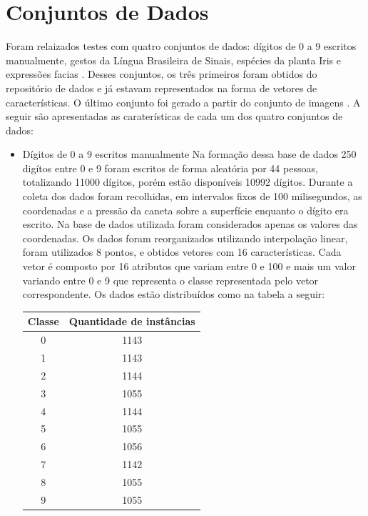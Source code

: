 \section{Conjuntos de Dados}
Foram relaizados testes com quatro conjuntos de dados: dígitos de 0 a 9 escritos manualmente, gestos da Língua Brasileira de Sinais, espécies da planta Iris e expressões facias . Desses conjuntos, os três primeiros foram obtidos do repositório de dados  e já estavam representados na forma de vetores de características. O último conjunto foi gerado a partir do conjunto de imagens . A seguir são apresentadas as caraterísticas de cada um dos quatro conjuntos de dados:

\begin{itemize}
\item{Dígitos de 0 a 9 escritos manualmente \cite{Digitos}}
Na formação dessa base de dados 250 digítos entre 0 e 9 foram escritos de forma aleatória por 44 pessoas, totalizando 11000 dígitos, porém estão disponíveis 10992 dígitos. Durante a coleta dos dados foram recolhidas, em intervalos fixos de 100 milisegundos, as coordenadas e a pressão da caneta sobre a superfície enquanto o dígito era escrito. Na base de dados utilizada foram considerados apenas os valores das coordenadas. Os dados foram reorganizados utilizando interpolação linear, foram utilizados 8 pontos, e obtidos vetores com 16 características.
Cada vetor é composto por 16 atributos que variam entre 0 e 100 e mais um valor variando entre 0 e 9 que representa o classe representada pelo vetor correspondente.
Os dados estão distribuídos como na tabela a seguir:
\begin{center}
	\begin{tabular}{cc}
        \hline
        Classe & Quantidade de instâncias \\
        \hline
		0 & 1143 \\
		1 & 1143 \\
		2 & 1144 \\
		3 & 1055 \\
		4 & 1144 \\
		5 & 1055 \\
		6 & 1056 \\
		7 & 1142 \\
		8 & 1055 \\
		9 & 1055 \\
        \hline
	\end{tabular}
	\label{tab:tabela}
\end{center}


\end{itemize}
